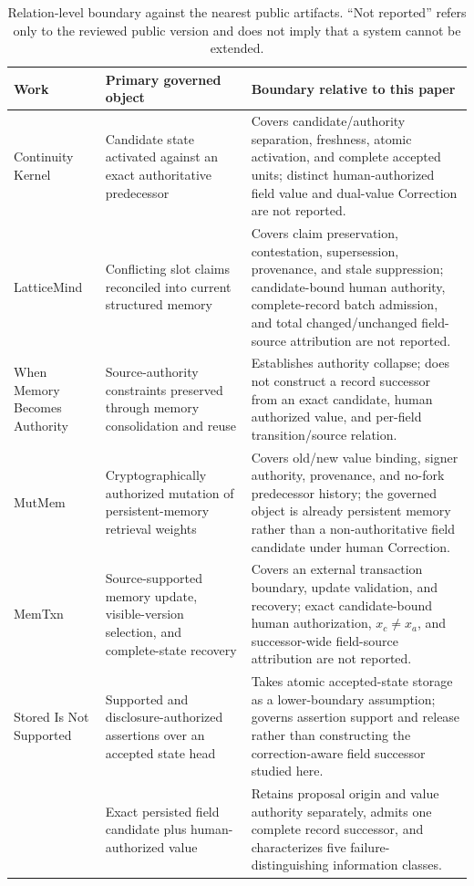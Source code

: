 \begin{table}[t]
\centering
\footnotesize
\caption{Relation-level boundary against the nearest public artifacts. ``Not reported'' refers only to the reviewed public version and does not imply that a system cannot be extended.}
\label{tab:nearest-neighbors}
\begin{tabularx}{\textwidth}{@{}>{\raggedright\arraybackslash}p{}>{\raggedright\arraybackslash}p{}>{\raggedright\arraybackslash}X@{}}
\toprule
Work & Primary governed object & Boundary relative to this paper \\
\midrule
Continuity Kernel & Candidate state activated against an exact authoritative predecessor & Covers candidate/authority separation, freshness, atomic activation, and complete accepted units; distinct human-authorized field value and dual-value Correction are not reported. \\
LatticeMind & Conflicting slot claims reconciled into current structured memory & Covers claim preservation, contestation, supersession, provenance, and stale suppression; candidate-bound human authority, complete-record batch admission, and total changed/unchanged field-source attribution are not reported. \\
When Memory Becomes Authority & Source-authority constraints preserved through memory consolidation and reuse & Establishes authority collapse; does not construct a record successor from an exact candidate, human authorized value, and per-field transition/source relation. \\
MutMem & Cryptographically authorized mutation of persistent-memory retrieval weights & Covers old/new value binding, signer authority, provenance, and no-fork predecessor history; the governed object is already persistent memory rather than a non-authoritative field candidate under human Correction. \\
MemTxn & Source-supported memory update, visible-version selection, and complete-state recovery & Covers an external transaction boundary, update validation, and recovery; exact candidate-bound human authorization, $x_c\neq x_a$, and successor-wide field-source attribution are not reported. \\
Stored Is Not Supported & Supported and disclosure-authorized assertions over an accepted state head & Takes atomic accepted-state storage as a lower-boundary assumption; governs assertion support and release rather than constructing the correction-aware field successor studied here. \\
\system{} & Exact persisted field candidate plus human-authorized value & Retains proposal origin and value authority separately, admits one complete record successor, and characterizes five failure-distinguishing information classes. \\
\bottomrule
\end{tabularx}
\end{table}
